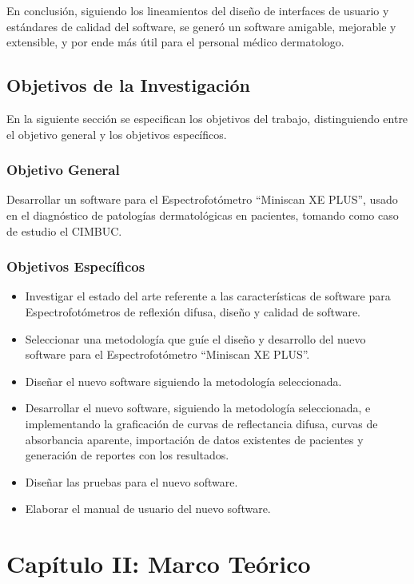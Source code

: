 \documentclass[12pt, a4paper]{article}
\begin{document}
En conclusi\'{o}n, siguiendo los lineamientos del dise\~{n}o de interfaces de usuario y est\'{a}ndares de calidad del software, se gener\'{o} un software amigable, mejorable y extensible, y por ende m\'{a}s \'{u}til para el personal m\'{e}dico dermatologo.

\pagebreak

\subsection{Objetivos de la Investigaci\'{o}n}
En la siguiente secci\'{o}n se especifican los objetivos del trabajo, distinguiendo entre el objetivo general y los objetivos espec\'{i}ficos.
	\subsubsection{Objetivo General}
	Desarrollar un software para el Espectrofot\'{o}metro ``Miniscan XE PLUS'', usado en el diagn\'{o}stico de patolog\'{i}as dermatol\'{o}gicas en pacientes, tomando como caso de estudio el CIMBUC.
	\subsubsection{Objetivos Espec\'{i}ficos}
	\begin{itemize}
		\item Investigar el estado del arte referente a las caracter\'{i}sticas de software para Espectrofot\'{o}metros de reflexi\'{o}n difusa, dise\~{n}o y calidad de software.
		\item Seleccionar una metodolog\'{i}a que gu\'{i}e el dise\~{n}o y desarrollo del nuevo software para el Espectrofot\'{o}metro ``Miniscan XE PLUS''.
		\item Dise\~{n}ar el nuevo software siguiendo la metodolog\'{i}a seleccionada.
		\item Desarrollar el nuevo software, siguiendo la metodolog\'{i}a seleccionada, e implementando la graficaci\'{o}n de curvas de reflectancia difusa, curvas de absorbancia aparente, importaci\'{o}n de datos existentes de pacientes y generaci\'{o}n de reportes con los resultados.
		\item Dise\~{n}ar las pruebas para el nuevo software.
		\item Elaborar el manual de usuario del nuevo software.
	\end{itemize}
\pagebreak
\section{Cap\'{i}tulo II: Marco Te\'{o}rico}
\end{document}
